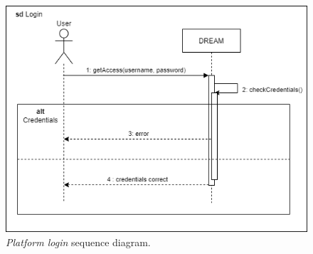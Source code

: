 \begin{figure}[H]
    \centering
    \includegraphics[width=\linewidth]{Images/Use Case/UC1.png}
    \caption{\textit{Platform login} sequence diagram.}
\end{figure}
\newpage

